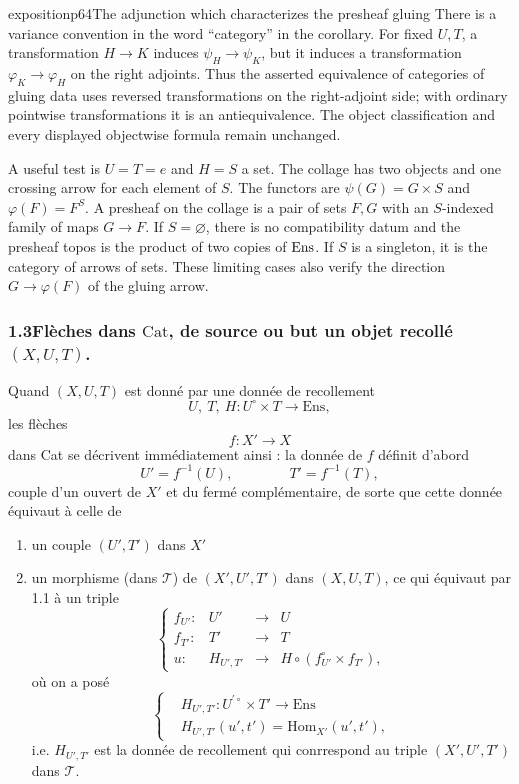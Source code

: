 \begin{dcomment}{exposition}{p64}{The adjunction which characterizes the presheaf gluing}
There is a variance convention in the word ``category'' in the corollary. For fixed $U,T$, a transformation $H\to K$ induces $\psi_H\to\psi_K$, but it induces a transformation $\varphi_K\to\varphi_H$ on the right adjoints. Thus the asserted equivalence of categories of gluing data uses reversed transformations on the right-adjoint side; with ordinary pointwise transformations it is an antiequivalence. The object classification and every displayed objectwise formula remain unchanged.

A useful test is $U=T=e$ and $H=S$ a set. The collage has two objects and one crossing arrow for each element of $S$. The functors are $\psi(G)=G\times S$ and $\varphi(F)=F^S$. A presheaf on the collage is a pair of sets $F,G$ with an $S$-indexed family of maps $G\to F$. If $S=\varnothing$, there is no compatibility datum and the presheaf topos is the product of two copies of $\mathrm{Ens}$. If $S$ is a singleton, it is the category of arrows of sets. These limiting cases also verify the direction $G\to\varphi(F)$ of the gluing arrow.
\end{dcomment}


\subsubsection*{1.3\quad Flèches dans $\mathrm{Cat}$, de source ou but un objet recollé $(X,U,T)$.}

Quand $(X,U,T)$ est donné par une donnée de recollement
\[
U,\ T,\ H : U^\circ \times T \longrightarrow \mathrm{Ens},
\]
les flèches
\[
f : X' \longrightarrow X
\]
dans Cat se décrivent immédiatement ainsi : la donnée de $f$ définit d'abord
\[
U' = f^{-1}(U), \qquad\qquad T' = f^{-1}(T),
\]
couple d'un ouvert de $X'$ et du fermé complémentaire, de sorte que cette donnée équivaut à celle de

\begin{enumerate}[label={}]
\item[$1^\circ$)] un couple $(U',T')$ dans $X'$
\item[$2^\circ$)] un morphisme (dans $\mathcal{T}$) de $(X',U',T')$ dans $(X,U,T)$, ce qui équivaut par 1.1 à un triple
\[
\left\{\begin{array}{rccl}
f_{U'} : & U' & \longrightarrow & U\\[1ex]
f_{T'} : & T' & \longrightarrow & T\\[1ex]
u : & H_{U',T'} & \longrightarrow & H \circ (f_{U'}^\circ \times f_{T'}),
\end{array}\right.
\]
où on a posé
\[
\left\{\begin{aligned}
&H_{U',T'} : U^{\prime\circ} \times T' \longrightarrow \mathrm{Ens}\\[1ex]
&H_{U',T'}(u',t') = \mathrm{Hom}_{X'}(u',t'),
\end{aligned}\right.
\]
i.e. $H_{U',T'}$ est la donnée de recollement qui conrrespond au triple $(X',U',T')$ dans $\mathcal{T}$. %
\end{enumerate}

